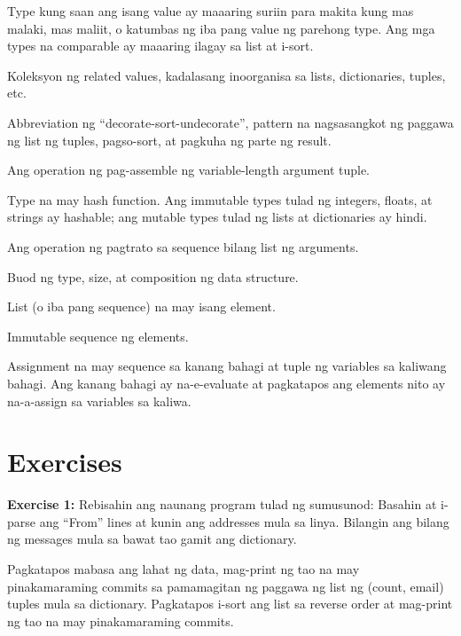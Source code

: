\documentclass[10pt,]{book}
\providecommand{\tightlist}{%
  \setlength{\itemsep}{0pt}\setlength{\parskip}{0pt}}
\begin{document}
\begin{description}
\tightlist
\item[comparable]
Type kung saan ang isang value ay maaaring suriin para makita kung mas
malaki, mas maliit, o katumbas ng iba pang value ng parehong type. Ang
mga types na comparable ay maaaring ilagay sa list at i-sort.
\item[data structure]
Koleksyon ng related values, kadalasang inoorganisa sa lists,
dictionaries, tuples, etc. 
\item[DSU]
Abbreviation ng ``decorate-sort-undecorate'', pattern na nagsasangkot ng
paggawa ng list ng tuples, pagso-sort, at pagkuha ng parte ng result.
\item[gather]
Ang operation ng pag-assemble ng variable-length argument tuple.
\item[hashable]
Type na may hash function. Ang immutable types tulad ng integers,
floats, at strings ay hashable; ang mutable types tulad ng lists at
dictionaries ay hindi. 
\item[scatter]
Ang operation ng pagtrato sa sequence bilang list ng arguments.
\item[shape (of a data structure)]
Buod ng type, size, at composition ng data structure. 
\item[singleton]
List (o iba pang sequence) na may isang element. 
\item[tuple]
Immutable sequence ng elements. 
\item[tuple assignment]
Assignment na may sequence sa kanang bahagi at tuple ng variables sa
kaliwang bahagi. Ang kanang bahagi ay na-e-evaluate at pagkatapos ang
elements nito ay na-a-assign sa variables sa kaliwa.
 
\end{description}

\section{Exercises}\label{exercises-9}

\textbf{Exercise 1:} Rebisahin ang naunang program tulad ng sumusunod:
Basahin at i-parse ang ``From'' lines at kunin ang addresses mula sa
linya. Bilangin ang bilang ng messages mula sa bawat tao gamit ang
dictionary.

Pagkatapos mabasa ang lahat ng data, mag-print ng tao na may
pinakamaraming commits sa pamamagitan ng paggawa ng list ng (count,
email) tuples mula sa dictionary. Pagkatapos i-sort ang list sa reverse
order at mag-print ng tao na may pinakamaraming commits.
\end{document}
